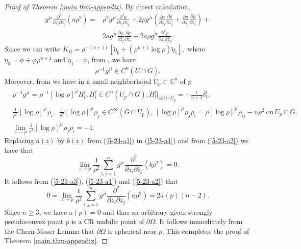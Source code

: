 \documentclass[a4paper,centertags,oneside,12pt]{amsart}
\numberwithin{equation}{section}
\begin{document}
\begin{proof}[Proof of Theorem \ref{main thm-appendix}]
By direct calculation,
\begin{equation}\label{5-23-a1}
\begin{split}
     g^{\overline ji}\frac{\partial^2}{\partial z_i\partial\overline z_j}(a\rho^2)=&\rho^2 g^{\overline j i}\frac{\partial^2 a}{\partial z_i\partial\overline z_j}+2\rho g^{\overline j i}\left(\frac{\partial a}{\partial z_i}\frac{\partial\rho}{\partial \overline z_j}+\frac{\partial a}{\partial \overline z_j}\frac{\partial \rho}{\partial z_i}\right)+\\
    &2a g^{\overline j i}\frac{\partial \rho}{\partial\overline z_j}\frac{\partial\rho}{\partial z_i}+2a\rho g^{\overline ji}\frac{\partial^2 \rho}{\partial z_i\partial\overline z_j}.
    \end{split}
\end{equation}
Since we can write $K_{\Omega}=\rho^{-(n+1)}[\widetilde \eta_0+(\rho^{n+1}\log\rho)\widetilde\eta_1],$
where $\widetilde\eta_0=\phi+\varphi\rho^{n+1}$ and $\widetilde\eta_1=\psi$, from  \cite[Theorem 3]{Eng08}, we have 
\begin{equation}
    \rho^{-1} g^{\overline j i}\in C^n(U\cap\overline G).
\end{equation}
Moreover, from \cite[Section 3]{Eng08} we have in  a small neighborhood $U_p\subset {\mathbb C}^n$ of $p$
\begin{equation}\label{5-23-a2}
\begin{split}
    &\rho^{-1}g^{\overline j i}=\rho^{-1}[\log \rho]^{\overline j l}H^i_l, H^i_l\in C^n(U_p\cap\overline G), H^i_l|_{\partial G\cap U_p}=-\frac{1}{n+1}\delta^i_l.\\
    &\frac{1}{\rho^2}[\log\rho]^{\overline j i}\rho_i, ~~\frac{1}{\rho^2}[\log\rho]^{\overline j i}\rho_{\overline j}\in C^\infty(\overline G\cap U_p),~[\log \rho]^{\overline j i}\rho_{\overline j}\rho_i=\rho [\log \rho]^{\overline j i}\rho_{i\overline j}-n\rho^2~\text{on}~U_p\cap\overline G.\\
    &\lim_{z\rightarrow p} \frac{1}{\rho^2}[\log \rho]^{\overline j i}\rho_{\overline j}\rho_i=-1.
    \end{split}
\end{equation}
Replacing $a(z)$ by $b(z)$ from (\ref{5-24-a1}) in (\ref{5-23-a1}) and from (\ref{5-23-a2}) we have that
\begin{equation}
    \lim_{z\rightarrow p}\frac{1}{\rho^2}\sum_{i, j=1}^n g^{\overline ji}\frac{\partial^2}{\partial z_i\partial\overline z_j}(b\rho^2)=0.
\end{equation}
It follows from (\ref{5-23-a3}), (\ref{5-23-a1}) and (\ref{5-23-a2}) that 
\begin{equation}
    0=\lim_{z\rightarrow p}\frac{1}{\rho^2}\sum_{i, j=1}^n g^{\overline ji}\frac{\partial^2}{\partial z_i\partial\overline z_j}(a\rho^2)=2a(p)(n-2).
\end{equation}
Since $n\geq 3$, we have $a(p)=0$ and thus an arbitrary given strongly pseudoconvex point $p$ is a CR umbilic point of $\partial\Omega$.
It follows immediately from the Chern-Moser Lemma \cite{CM74} that $\partial\Omega$ is spherical near $p$.
This completes the proof of Theorem  \ref{main thm-appendix}.

\end{proof}
\end{document}
